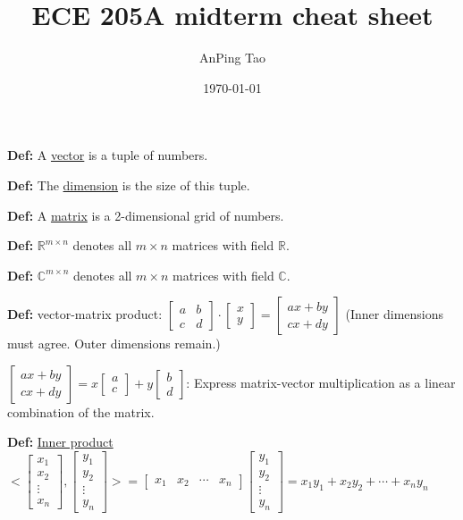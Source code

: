 \documentclass{report}
\title{ECE 205A midterm cheat sheet}
\author{AnPing Tao}
\date{\today}
\begin{document}
\textbf{Def:} A \underline{vector} is a tuple of numbers.

\textbf{Def:} The \underline{dimension} is the size of this tuple.

\textbf{Def:} A \underline{matrix} is a 2-dimensional grid of numbers.

\textbf{Def:} $\mathbb{R}^{m \times n}$ denotes all $m \times n$ matrices with field $\mathbb{R}$.

\textbf{Def:} $\mathbb{C}^{m \times n}$ denotes all $m \times n$ matrices with field $\mathbb{C}$.

\textbf{Def:} vector-matrix product:
$\begin{bmatrix}
        a & b \\
        c & d
    \end{bmatrix} \cdot
    \begin{bmatrix}
        x \\y
    \end{bmatrix} =
    \begin{bmatrix}
        ax + by \\
        cx + dy
    \end{bmatrix}$
(Inner dimensions must agree. Outer dimensions remain.)

$\begin{bmatrix}
        ax + by \\
        cx + dy
    \end{bmatrix} =
    x \begin{bmatrix}
        a \\c
    \end{bmatrix} + y
    \begin{bmatrix}
        b \\d
    \end{bmatrix}$: Express matrix-vector multiplication as a linear combination of the matrix.

\textbf{Def:} \underline{Inner product}
$<\begin{bmatrix}
        x_1 \\ x_2 \\ \vdots \\ x_n
    \end{bmatrix},
    \begin{bmatrix}
        y_1 \\ y_2 \\ \vdots \\ y_n
    \end{bmatrix}> =
    \begin{bmatrix}
        x_1 & x_2 & \cdots & x_n
    \end{bmatrix}
    \begin{bmatrix}
        y_1 \\ y_2 \\ \vdots \\ y_n
    \end{bmatrix} = x_1y_1 + x_2y_2 + \cdots + x_ny_n$
\end{document}
